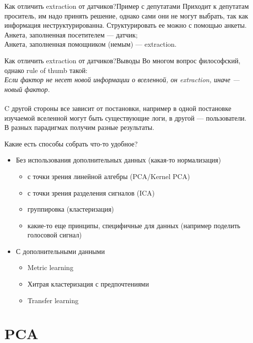 \documentclass[14pt, fleqn, xcolor={dvipsnames, table}]{beamer}
\begin{document}
\begin{frame}{Как отличить extraction от датчиков?}{Пример с депутатами}
Приходит к депутатам проситель, им надо принять решение, однако сами они не могут выбрать, так как информация неструктурированна. Структурировать ее можно с помощью анкеты.\\
Анкета, заполненная посетителем --- датчик; \\
Анкета, заполненная помощником (немым) ---  extraction.
\end{frame}

\begin{frame}{Как отличить extraction от датчиков?}{Выводы}
Во многом вопрос философский, однако rule of thumb такой:\\
\textit{Если фактор не несет новой информации о вселенной, он extraction, иначе --- новый фактор.}\\
~\\
C другой стороны все зависит от постановки, например в одной постановке изучаемой вселенной могут быть существующие логи, в другой --- пользователи. В разных парадигмах получим разные результаты. 
\end{frame}

\begin{frame}{Какие есть способы собрать что-то удобное?}
\begin{itemize}
  \item Без использования дополнительных данных (какая-то нормализация)
  \begin{itemize}
    \item с точки зрения линейной алгебры (PCA/Kernel PCA)
    \item с точки зрения разделения сигналов (ICA)
    \item группировка (кластеризация)
    \item какие-то еще принципы, специфичные для данных (например поделить голосовой сигнал)
  \end{itemize}
  \item С дополнительными данными
  \begin{itemize}
    \item Metric learning
    \item Хитрая кластеризация с предпочтениями
    \item Transfer learning
  \end{itemize}
\end{itemize}
\end{frame}

\section{PCA}
\end{document}
